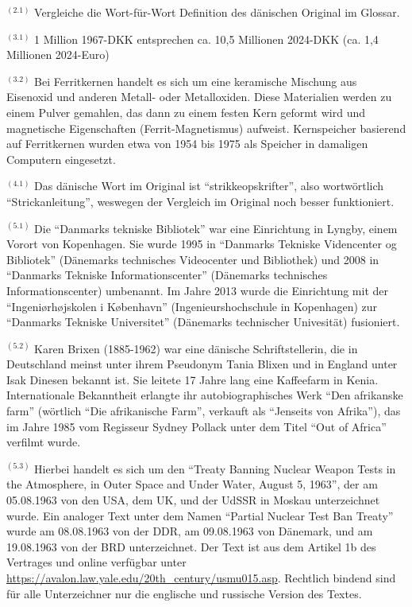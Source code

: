 $^{(2.1)}$ Vergleiche die Wort-für-Wort Definition des dänischen Original im Glossar.

$^{(3.1)}$
1 Million 1967-DKK entsprechen ca. 10,5 Millionen 2024-DKK (ca. 1,4 Millionen 2024-Euro)

$^{(3.2)}$
Bei Ferritkernen handelt es sich um eine keramische Mischung aus Eisenoxid und anderen Metall- oder Metalloxiden. Diese Materialien werden zu einem Pulver gemahlen, das dann zu einem festen Kern geformt wird und magnetische Eigenschaften (Ferrit-Magnetismus) aufweist. Kernspeicher basierend auf Ferritkernen wurden etwa von 1954 bis 1975 als Speicher in damaligen Computern eingesetzt.

$^{(4.1)}$ Das dänische Wort im Original ist \enquote{strikkeopskrifter}, also wortwörtlich \enquote{Strickanleitung}, weswegen der Vergleich im Original noch besser funktioniert.

$^{(5.1)}$
Die \enquote{Danmarks tekniske Bibliotek} war eine Einrichtung in Lyngby, einem Vorort von Kopenhagen. Sie wurde 1995 in \enquote{Danmarks Tekniske Videncenter og Bibliotek} (Dänemarks technisches Videocenter und Bibliothek) und 2008 in \enquote{Danmarks Tekniske Informationscenter} (Dänemarks technisches Informationscenter) umbenannt. Im Jahre 2013 wurde die Einrichtung mit der \enquote{Ingeniørhøjskolen i København} (Ingenieurshochschule in Kopenhagen) zur \enquote{Danmarks Tekniske Universitet} (Dänemarks technischer Univesität) fusioniert.

$^{(5.2)}$
Karen Brixen (1885-1962) war eine dänische Schriftstellerin, die in Deutschland meinst unter ihrem Pseudonym Tania Blixen und in England unter Isak Dinesen bekannt ist. Sie leitete 17 Jahre lang eine Kaffeefarm in Kenia. Internationale Bekanntheit erlangte ihr autobiographisches Werk \enquote{Den afrikanske farm} (wörtlich \enquote{Die afrikanische Farm}, verkauft als \enquote{Jenseits von Afrika}), das im Jahre 1985 vom Regisseur Sydney Pollack unter dem Titel \enquote{Out of Africa} verfilmt wurde.

$^{(5.3)}$
Hierbei handelt es sich um den \enquote{Treaty Banning Nuclear Weapon Tests in the Atmosphere, in Outer Space and Under Water, August 5, 1963}, der am 05.08.1963 von den USA, dem UK, und der UdSSR in Moskau unterzeichnet wurde. Ein analoger Text unter dem Namen \enquote{Partial Nuclear Test Ban Treaty} wurde am 08.08.1963 von der DDR, am 09.08.1963 von Dänemark, und am 19.08.1963 von der BRD unterzeichnet. Der Text ist aus dem Artikel 1b des Vertrages und online verfügbar unter \url{https://avalon.law.yale.edu/20th_century/usmu015.asp}. Rechtlich bindend sind für alle Unterzeichner nur die englische und russische Version des Textes.

